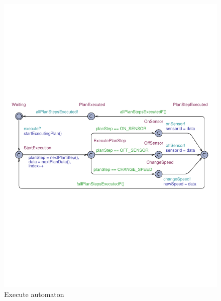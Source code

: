 \begin{figure}[t]
	\centering
	\includegraphics[trim = 10mm 95mm 5mm 105mm, clip, width=\textwidth]{figures/Executor}
	\caption{Execute automaton}\label{fig:execute-automaton}
	
	\vspace*{-2mm}
\end{figure}



